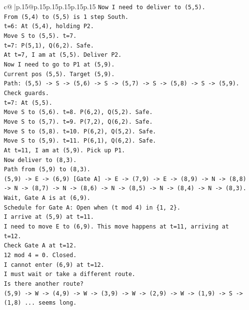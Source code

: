 \documentclass{article}
\begin{document}
{\begin{supertabular}{c@{$\;$}|p{.15\linewidth}@{}p{.15\linewidth}p{.15\linewidth}p{.15\linewidth}p{.15\linewidth}p{.15\linewidth}}
{{{\texttt{Now I need to deliver to (5,5).} \\
\texttt{From (5,4) to (5,5) is 1 step South.} \\
\texttt{t=6: At (5,4), holding P2.} \\
\texttt{Move S to (5,5). t=7.} \\
\texttt{t=7: P(5,1), Q(6,2). Safe.} \\
\texttt{At t=7, I am at (5,5). Deliver P2.} \\
\texttt{Now I need to go to P1 at (5,9).} \\
\texttt{Current pos (5,5). Target (5,9).} \\
\texttt{Path: (5,5) {-}> S {-}> (5,6) {-}> S {-}> (5,7) {-}> S {-}> (5,8) {-}> S {-}> (5,9).} \\
\texttt{Check guards.} \\
\texttt{t=7: At (5,5).} \\
\texttt{Move S to (5,6). t=8. P(6,2), Q(5,2). Safe.} \\
\texttt{Move S to (5,7). t=9. P(7,2), Q(6,2). Safe.} \\
\texttt{Move S to (5,8). t=10. P(6,2), Q(5,2). Safe.} \\
\texttt{Move S to (5,9). t=11. P(6,1), Q(6,2). Safe.} \\
\texttt{At t=11, I am at (5,9). Pick up P1.} \\
\texttt{Now deliver to (8,3).} \\
\texttt{Path from (5,9) to (8,3).} \\
\texttt{(5,9) {-}> E {-}> (6,9) {[}Gate A{]} {-}> E {-}> (7,9) {-}> E {-}> (8,9) {-}> N {-}> (8,8) {-}> N {-}> (8,7) {-}> N {-}> (8,6) {-}> N {-}> (8,5) {-}> N {-}> (8,4) {-}> N {-}> (8,3).} \\
\texttt{Wait, Gate A is at (6,9).} \\
\texttt{Schedule for Gate A: Open when (t mod 4) in \{1, 2\}.} \\
\texttt{I arrive at (5,9) at t=11.} \\
\texttt{I need to move E to (6,9). This move happens at t=11, arriving at t=12.} \\
\texttt{Check Gate A at t=12.} \\
\texttt{12 mod 4 = 0. Closed.} \\
\texttt{I cannot enter (6,9) at t=12.} \\
\texttt{I must wait or take a different route.} \\
\texttt{Is there another route?} \\
\texttt{(5,9) {-}> W {-}> (4,9) {-}> W {-}> (3,9) {-}> W {-}> (2,9) {-}> W {-}> (1,9) {-}> S {-}> (1,8) ... seems long.} \\
}}}
\end{supertabular}}
\end{document}
